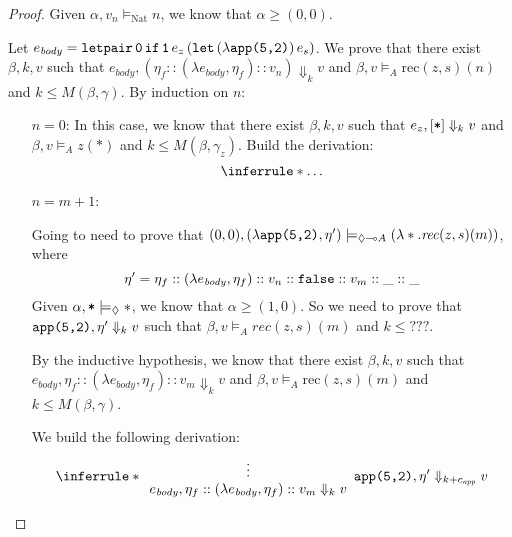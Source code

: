 \documentclass{workingnote}
\newcommand{\TyNat}{\mathrm{Nat}}
\begin{document}
\begin{proof}
  Given $\alpha, v_n \models_\TyNat n$, we know that $\alpha \geq (0,0)$.

  Let
  $e_{\mathit{body}} =
  \texttt{letpair}\,\texttt{0}\,\texttt{if}\,\texttt{1}\,e_z\,(\texttt{let}\,(\lambda\texttt{app(}\texttt{5}\texttt{,}\texttt{2}\texttt{)})\,e_s)$. We
  prove that there exist $\beta, k, v$ such that
  $e_{\mathit{body}}, (\eta_f :: (\lambda e_{\mathit{body}}, \eta_f)
  :: v_n) \Downarrow_k v$ and
  $\beta, v \models_A \mathrm{rec}(z,s)(n)$ and
  $k \leq M(\beta, \gamma)$. By induction on $n$:
  \begin{itemize}
  \item[$n = 0$:] In this case, we know that there exist $\beta, k, v$
    such that $e_z, [\texttt{*}] \Downarrow_k v$ and
    $\beta, v \models_A z(*)$ and $k \leq M(\beta, \gamma_z)$. Build
    the derivation:
    \begin{displaymath}
      \inferrule*
      { }
      {\dots}
    \end{displaymath}
  \item[$n = m + 1$:]

    Going to need to prove that
    $(0,0), (\lambda \texttt{app(}\texttt{5}\texttt{,}\texttt{2}\texttt{)}, \eta')
    \models_{\Diamond \multimap A} (\lambda *. \mathit{rec}(z,s)(m))$,
    where
    \begin{displaymath}
      \eta' = \eta_f :: (\lambda e_{\mathit{body}}, \eta_f ) :: v_n :: \texttt{false} :: v_m :: \_ :: \_
    \end{displaymath}
    Given $\alpha, \texttt{*} \models_\Diamond *$, we know that
    $\alpha \geq (1,0)$. So we need to prove that
    $\texttt{app(}\texttt{5}\texttt{,}\texttt{2}\texttt{)}, \eta' \Downarrow_k v$ such that
    $\beta, v \models_A \mathit{rec}(z,s)(m)$ and $k \leq ???$.

    By the inductive hypothesis, we know that there exist
    $\beta, k, v$ such that
    $e_{\mathit{body}}, \eta_f :: (\lambda e_{\mathit{body}}, \eta_f)
    :: v_m \Downarrow_k v$ and
    $\beta, v \models_A \mathrm{rec}(z,s)(m)$ and
    $k \leq M(\beta, \gamma)$.

    We build the following derivation:
    \begin{displaymath}
      \inferrule*
      { {\begin{array}{c} \vdots \\ e_{\mathit{body}}, \eta_f :: (\lambda e_{\mathit{body}}, \eta_f) :: v_m \Downarrow_k v \end{array}}}
      {\Apply{\Idx{5}}{\Idx{2}}, \eta' \Downarrow_{k+\cnstApp} v}
    \end{displaymath}
  \end{itemize}
\end{proof}
\end{document}
